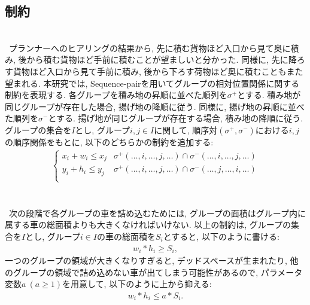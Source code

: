 \subsection{制約}
\\
\ プランナーへのヒアリングの結果から, 先に積む貨物ほど入口から見て奥に積み, 後から積む貨物ほど手前に積むことが望ましいと分かった. 
同様に, 先に降ろす貨物ほど入口から見て手前に積み, 後から下ろす荷物ほど奥に積むこともまた望まれる. 
本研究では, Sequence-pairを用いてグループの相対位置関係に関する制約を表現する. 
各グループを積み地の昇順に並べた順列を$\sigma^+$とする. 
積み地が同じグループが存在した場合, 揚げ地の降順に従う. 
同様に, 揚げ地の昇順に並べた順列を$\sigma^-$とする. 
揚げ地が同じグループが存在する場合, 積み地の降順に従う. \\
グループの集合を$I$とし, グループ$i,j \in I$に関して, 順序対$(\sigma^+,\sigma^-)$における$i,j$の順序関係をもとに, 以下のどちらかの制約を追加する: \\
\begin{eqnarray}
    \left\{
        \begin{array}{ll}
            x_i + w_i \leq x_j & \sigma^+(\ldots,i,\ldots,j,\ldots) \cap \sigma^-(\ldots,i,\ldots,j,\ldots) \\
            y_i + h_i \leq y_j & \sigma^+(\ldots,i,\ldots,j,\ldots) \cap \sigma^-(\ldots,j,\ldots,i,\ldots) \\
        \end{array}
    \right.
\end{eqnarray}\\


\\
\ 次の段階で各グループの車を詰め込むためには, グループの面積はグループ内に属する車の総面積よりも大きくなければいけない. 
以上の制約は, グループの集合を$I$とし, グループ$i \in I$の車の総面積を$S_i$とすると, 以下のように書ける: \\
\begin{eqnarray}
    w_i*h_i \geq S_i , 
\end{eqnarray}
一つのグループの領域が大きくなりすぎると, デッドスペースが生まれたり, 他のグループの領域で詰め込めない車が出てしまう可能性があるので, パラメータ変数$a\ (a \geq 1)$を用意して, 以下のように上から抑える:  
\begin{eqnarray}
    w_i*h_i \leq a*S_i.
    \label{a_const}
\end{eqnarray}\\

